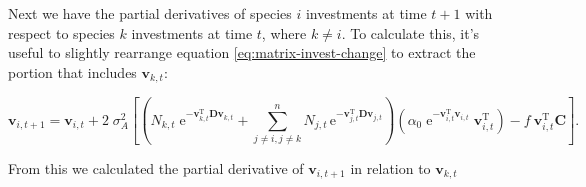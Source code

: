 Next we have the partial derivatives of species $i$ investments at time $t+1$ with respect to 
species $k$ investments at time $t$, where $k \ne i$.
To calculate this, it's useful to slightly rearrange equation \ref{eq:matrix-invest-change} to
extract the portion that includes $\mathbf{v}_{k,t}$:


\begin{equation*}
    \mathbf{v}_{i,t+1} = \mathbf{v}_{i,t} + 2 \; \sigma_A^2
    \left[
        \left(
            N_{k,t} \; \textrm{e}^{ -\mathbf{v}_{k,t}^{\textrm{T}} \mathbf{D}
            \mathbf{v}_{k,t} } + 
            \sum_{j \ne i, j \ne k}^{n}{ N_{j,t} \, \textrm{e}^{
                - \mathbf{v}_{j,t}^{\textrm{T}}
                \mathbf{D} \mathbf{v}_{j,t} } }
        \right)
        \left(
            \alpha_0 \; \textrm{e}^{-\mathbf{v}_{i,t}^{\textrm{T}}
            \mathbf{v}_{i,t} } \; \mathbf{v}_{i,t}^{\textrm{T}}
        \right)
        - f \: \mathbf{v}_{i,t}^{\textrm{T}} \mathbf{C}
    \right]
    \textrm{.}
\end{equation*}

From this we calculated the partial derivative of $\mathbf{v}_{i,t+1}$ in relation to
$\mathbf{v}_{k,t}$


